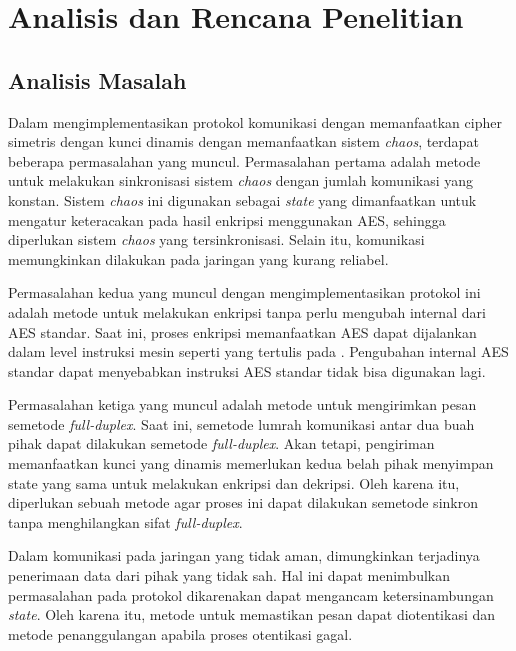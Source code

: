 

\chapter{Analisis dan Rencana Penelitian}

\section{Analisis Masalah}

Dalam mengimplementasikan protokol komunikasi dengan memanfaatkan cipher simetris dengan kunci dinamis dengan memanfaatkan sistem \emph{chaos}, terdapat beberapa permasalahan yang muncul. Permasalahan pertama adalah metode untuk melakukan sinkronisasi sistem \emph{chaos} dengan jumlah komunikasi yang konstan. Sistem \emph{chaos} ini digunakan sebagai \emph{state} yang dimanfaatkan untuk mengatur keteracakan pada hasil enkripsi menggunakan AES, sehingga diperlukan sistem \emph{chaos} yang tersinkronisasi. Selain itu, komunikasi memungkinkan dilakukan pada jaringan yang kurang reliabel.

Permasalahan kedua yang muncul dengan mengimplementasikan protokol ini adalah metode untuk melakukan enkripsi tanpa perlu mengubah internal dari AES standar. Saat ini, proses enkripsi memanfaatkan AES dapat dijalankan dalam level instruksi mesin seperti yang tertulis pada \textcite{gueron2010}. Pengubahan internal AES standar dapat menyebabkan instruksi AES standar tidak bisa digunakan lagi.

Permasalahan ketiga yang muncul adalah metode untuk mengirimkan pesan semetode \emph{full-duplex}. Saat ini, semetode lumrah komunikasi antar dua buah pihak dapat dilakukan semetode \emph{full-duplex}. Akan tetapi, pengiriman memanfaatkan kunci yang dinamis memerlukan kedua belah pihak menyimpan state yang sama untuk melakukan enkripsi dan dekripsi. Oleh karena itu, diperlukan sebuah metode agar proses ini dapat dilakukan semetode sinkron tanpa menghilangkan sifat \emph{full-duplex}.

Dalam komunikasi pada jaringan yang tidak aman, dimungkinkan terjadinya penerimaan data dari pihak yang tidak sah. Hal ini dapat menimbulkan permasalahan pada protokol dikarenakan dapat mengancam ketersinambungan \emph{state}. Oleh karena itu, metode untuk memastikan pesan dapat diotentikasi dan metode penanggulangan apabila proses otentikasi gagal.

